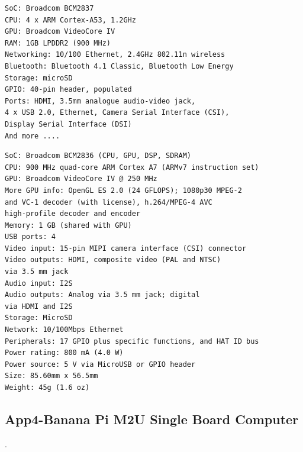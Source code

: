 \clearpage
\pagebreak

\lstset{basicstyle=\ttfamily\small}
\begin{lstlisting}[breaklines, frame=single, caption={App4-Specifications of Raspberry Pi 3 SBC Board}, label=App4-Specifications-of -Raspberry-Pi-3-SBC-Board]
SoC: Broadcom BCM2837
CPU: 4 x ARM Cortex-A53, 1.2GHz
GPU: Broadcom VideoCore IV
RAM: 1GB LPDDR2 (900 MHz)
Networking: 10/100 Ethernet, 2.4GHz 802.11n wireless
Bluetooth: Bluetooth 4.1 Classic, Bluetooth Low Energy
Storage: microSD
GPIO: 40-pin header, populated
Ports: HDMI, 3.5mm analogue audio-video jack, 
4 x USB 2.0, Ethernet, Camera Serial Interface (CSI), 
Display Serial Interface (DSI)
And more ....
\end{lstlisting}

\lstset{basicstyle=\ttfamily\small}
\begin{lstlisting}[breaklines, frame=single, caption={App4-Specifications of Raspberry Pi 2 SBC Board}, label=App4-Specifications-of -Raspberry-Pi-2-SBC-Board]
SoC: Broadcom BCM2836 (CPU, GPU, DSP, SDRAM)
CPU: 900 MHz quad-core ARM Cortex A7 (ARMv7 instruction set)
GPU: Broadcom VideoCore IV @ 250 MHz
More GPU info: OpenGL ES 2.0 (24 GFLOPS); 1080p30 MPEG-2 
and VC-1 decoder (with license), h.264/MPEG-4 AVC 
high-profile decoder and encoder
Memory: 1 GB (shared with GPU)
USB ports: 4
Video input: 15-pin MIPI camera interface (CSI) connector
Video outputs: HDMI, composite video (PAL and NTSC)
via 3.5 mm jack
Audio input: I2S
Audio outputs: Analog via 3.5 mm jack; digital 
via HDMI and I2S
Storage: MicroSD
Network: 10/100Mbps Ethernet
Peripherals: 17 GPIO plus specific functions, and HAT ID bus
Power rating: 800 mA (4.0 W)
Power source: 5 V via MicroUSB or GPIO header
Size: 85.60mm x 56.5mm
Weight: 45g (1.6 oz)
\end{lstlisting}


\clearpage
\pagebreak

\subsection{App4-Banana Pi M2U Single Board Computer}.

